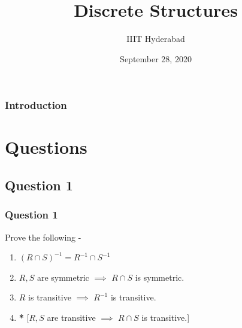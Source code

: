 \documentclass[xcolor=svgnames]{beamer}
\title[Discrete Structures]{Discrete Structures} %
\author{IIIT Hyderabad} %
\institute[] %
{
Monsoon 2020 \\ %
\medskip
\textit{Tutorial 4} %
}
\date{September 28, 2020} %
\begin{document}
\begin{frame}
\titlepage %
\end{frame}

\begin{frame}
\frametitle{Introduction} %
\tableofcontents %
\end{frame}



\section{Questions}

\subsection{Question 1}
\begin{frame}
\frametitle{Question 1}
Prove the following - 
\begin{enumerate}
    \item  $(R \cap S)^{-1} = R^{-1} \cap S^{-1}$
    \item  $R,S$ are symmetric $\implies$ $R \cap S$ is symmetric.
    \item  $R$ is transitive $\implies$ $R^{-1}$ is transitive.
    \item  \textbf{*} [$R,S$ are transitive $\implies$ $R \cap S$ is transitive.]
\end{enumerate}

\end{frame}
\end{document}
